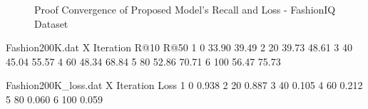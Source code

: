 \documentclass[10pt,lineno]{wlpeerj}
\begin{document}
\begin{figure}[h!]
\caption{Proof Convergence of Proposed Model's Recall and Loss - FashionIQ Dataset}
\label{fig:Fashion_IQ_Convergence}
\end{figure}

\begin{filecontents}{Fashion200K.dat}
X Iteration     R@10        R@50                
1 0	            33.90       39.49                 
2 20            39.73       48.61               	
3 40		    45.04       55.57     
4 60            48.34       68.84     	    
5 80            52.86       70.71     	    
6 100           56.47       75.73     	    
\end{filecontents}

\begin{filecontents}{Fashion200K_loss.dat}
X Iteration    Loss           
1 0	          0.938       
2 20          0.887      
3 40		  0.105       
4 60          0.212      
5 80          0.060       
6 100         0.059       
\end{filecontents}
\end{document}
